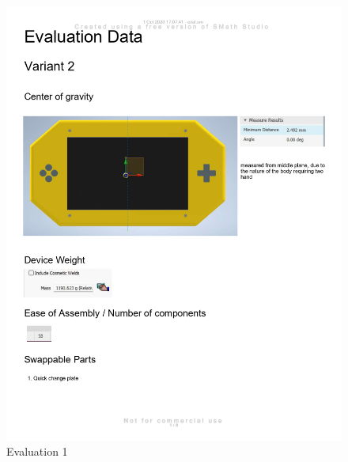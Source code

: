 \begin{figure}[H]
    \centering
    \includegraphics[width=\linewidth]{texs/appendix/data/evaluation/eval_page-0001.jpg}
    \caption{Evaluation 1}
    \label{fig:evaluation-1}
\end{figure}

